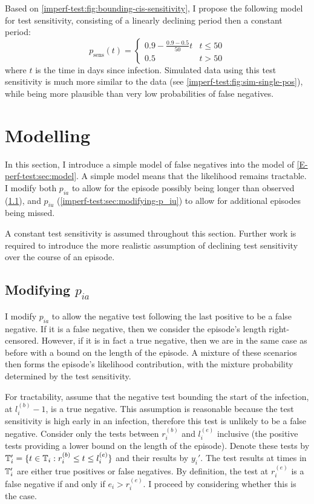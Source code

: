 \documentclass[thesis.tex]{subfiles}
\begin{document}
Based on \cref{imperf-test:fig:bounding-cis-sensitivity}, I propose the following model for test sensitivity, consisting of a linearly declining period then a constant period:
\begin{equation}
  p_\text{sens}(t) = \begin{cases}
    0.9 - \frac{0.9-0.5}{50}t &t \leq 50 \\
    0.5 &t > 50
  \end{cases}
  \label{imperf-test:eq:variable-test-sensitivity}
\end{equation}
where $t$ is the time in days since infection.
Simulated data using this test sensitivity is much more similar to the data (see \cref{imperf-test:fig:sim-single-pos}), while being more plausible than very low probabilities of false negatives.

\section{Modelling} \label{imperf-test:sec:modelling}

In this section, I introduce a simple model of false negatives into the model of \cref{E-perf-test:sec:model}.
A simple model means that the likelihood remains tractable.
I modify both $p_{ia}$ to allow for the episode possibly being longer than observed (\cref{imperf-test:sec:modifying-p_ia}), and $p_{iu}$ (\cref{imperf-test:sec:modifying-p_iu}) to allow for additional episodes being missed.

A constant test sensitivity is assumed throughout this section.
Further work is required to introduce the more realistic assumption of declining test sensitivity over the course of an episode.

\subsection{Modifying \texorpdfstring{$p_{ia}$}{pia}} \label{imperf-test:sec:modifying-p_ia}

I modify $p_{ia}$ to allow the negative test following the last positive to be a false negative.
If it is a false negative, then we consider the episode's length right-censored.
However, if it is in fact a true negative, then we are in the same case as before with a bound on the length of the episode.
A mixture of these scenarios then forms the episode's likelihood contribution, with the mixture probability determined by the test sensitivity.

For tractability, assume that the negative test bounding the start of the infection, at $l_i^{(b)}-1$, is a true negative.
This assumption is reasonable because the test sensitivity is high early in an infection, therefore this test is unlikely to be a false negative.
Consider only the tests between $r_i^{(b)}$ and $l_i^{(e)}$ inclusive (the positive tests providing a lower bound on the length of the episode).
Denote these tests by $\mathbb{T}'_i = \{ t \in \mathbb{T}_i : r_i^{(b)} \leq t \leq l_i^{(e)} \}$ and their results by $y_i'$.
The test results at times in $\mathbb{T}_i'$ are either true positives or false negatives. 
By definition, the test at $r_i^{(e)}$ is a false negative if and only if $e_i > r_i^{(e)}$.
I proceed by considering whether this is the case.
\end{document}
